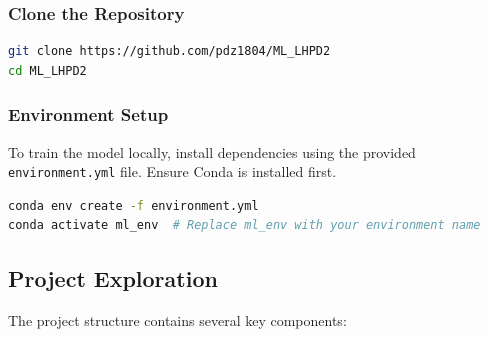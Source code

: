 \subsubsection{Clone the Repository}

\begin{lstlisting}[language=bash]
git clone https://github.com/pdz1804/ML_LHPD2
cd ML_LHPD2
\end{lstlisting}

\subsubsection{Environment Setup}

To train the model locally, install dependencies using the provided \texttt{environment.yml} file. Ensure Conda is installed first.

\begin{lstlisting}[language=bash]
conda env create -f environment.yml
conda activate ml_env  # Replace ml_env with your environment name
\end{lstlisting}

\subsection{Project Exploration}

The project structure contains several key components:

